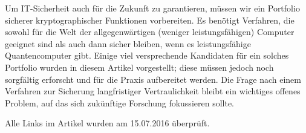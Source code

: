 \begin{refsegment}
Um IT-Sicherheit auch für die Zukunft zu garantieren, müssen wir ein
Portfolio sicherer kryptographischer Funktionen vorbereiten. Es benötigt
Verfahren, die sowohl für die Welt der allgegenwärtigen (weniger
leistungsfähigen) Computer geeignet sind als auch dann sicher bleiben,
wenn es leistungsfähige Quantencomputer gibt.
Einige viel versprechende
Kandidaten für ein solches Portfolio wurden in diesem Artikel
vorgestellt; diese müssen jedoch noch sorgfältig erforscht und für die
Praxis aufbereitet werden. Die Frage nach einem Verfahren zur Sicherung
langfristiger Vertraulichkeit bleibt ein wichtiges offenes Problem, auf
das sich zukünftige Forschung fokussieren sollte.


\printbibliography[%
	heading=subbibintoc,
	title={Literatur zu Kapitel \thechapter},
	segment=\therefsegment,
]


Alle Links im Artikel wurden am 15.07.2016 überprüft.

\end{refsegment}
